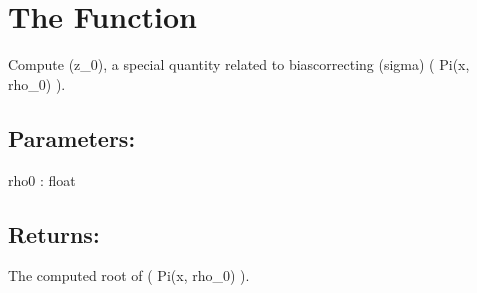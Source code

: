 \documentclass[a4paper,11pt,openany,english]{sphinxmanual}
\begin{document}
\section{The  Function}
\label{\detokenize{api_biascorrection:the-z0-function}}

\begin{fulllineitems}
\label{\detokenize{api_biascorrection:xtremes.biascorrection.z0}}
\pysigstartsignatures
{}
\pysigstopsignatures
\sphinxAtStartPar
Compute (z\_0), a special quantity related to bias\sphinxhyphen{}correcting (sigma) ( Pi(x, rho\_0) ).


\subsection{Parameters:}
\label{\detokenize{api_biascorrection:id25}}
\sphinxAtStartPar
rho0 : float


\subsection{Returns:}
\label{\detokenize{api_biascorrection:id26}}\begin{description}
\sphinxAtStartPar
The computed root of ( Pi(x, rho\_0) ).

\end{description}

\end{fulllineitems}




\renewcommand{\indexname}{Index}
\printindex
\end{document}

